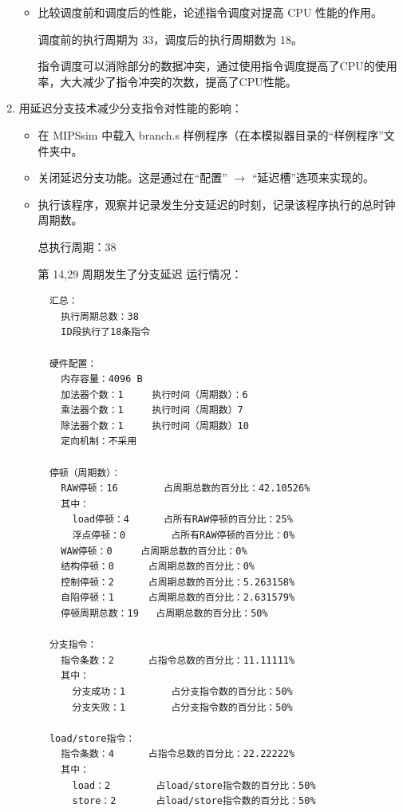 \documentclass[blue,normal,cn]{elegantnote}
\begin{document}
\begin{enumerate}[wide=0pt, listparindent=2em, parsep=0pt]
\begin{itemize}[leftmargin=3em, listparindent=2em, parsep=0pt]
          \item 比较调度前和调度后的性能，论述指令调度对提高 CPU 性能的作用。

                \textcolor{ans}{调度前的执行周期为 33，调度后的执行周期数为 18。}

                \textcolor{ans}{指令调度可以消除部分的数据冲突，通过使用指令调度提高了CPU的使用率，大大减少了指令冲突的次数，提高了CPU性能。}


        \end{itemize}

  \item 用延迟分支技术减少分支指令对性能的影响：

        \begin{itemize}[leftmargin=3em, listparindent=2em, parsep=0pt]
          \item 在 MIPSsim 中载入 branch.s 样例程序（在本模拟器目录的“样例程序”文件夹中。
          \item 关闭延迟分支功能。这是通过在“配置” $\rightarrow$ “延迟槽”选项来实现的。
          \item 执行该程序，观察并记录发生分支延迟的时刻，记录该程序执行的总时钟周期数。

                \textcolor{ans}{总执行周期：38}

                \textcolor{ans}{第 14,29 周期发生了分支延迟}
                \textcolor{ans}{运行情况：}
                \begin{lstlisting}
  汇总：
    执行周期总数：38
    ID段执行了18条指令

  硬件配置：
    内存容量：4096 B
    加法器个数：1		执行时间（周期数）：6
    乘法器个数：1		执行时间（周期数）7		
    除法器个数：1		执行时间（周期数）10		
    定向机制：不采用

  停顿（周期数）：
    RAW停顿：16		占周期总数的百分比：42.10526%
    其中：
      load停顿：4		占所有RAW停顿的百分比：25%
      浮点停顿：0		占所有RAW停顿的百分比：0%
    WAW停顿：0		占周期总数的百分比：0%
    结构停顿：0		占周期总数的百分比：0%
    控制停顿：2		占周期总数的百分比：5.263158%
    自陷停顿：1		占周期总数的百分比：2.631579%
    停顿周期总数：19	占周期总数的百分比：50%

  分支指令：
    指令条数：2		占指令总数的百分比：11.11111%
    其中：
      分支成功：1		占分支指令数的百分比：50%
      分支失败：1		占分支指令数的百分比：50%

  load/store指令：
    指令条数：4		占指令总数的百分比：22.22222%
    其中：
      load：2		占load/store指令数的百分比：50%
      store：2		占load/store指令数的百分比：50%


\end{lstlisting}
\end{itemize}
\end{enumerate}
\end{document}
